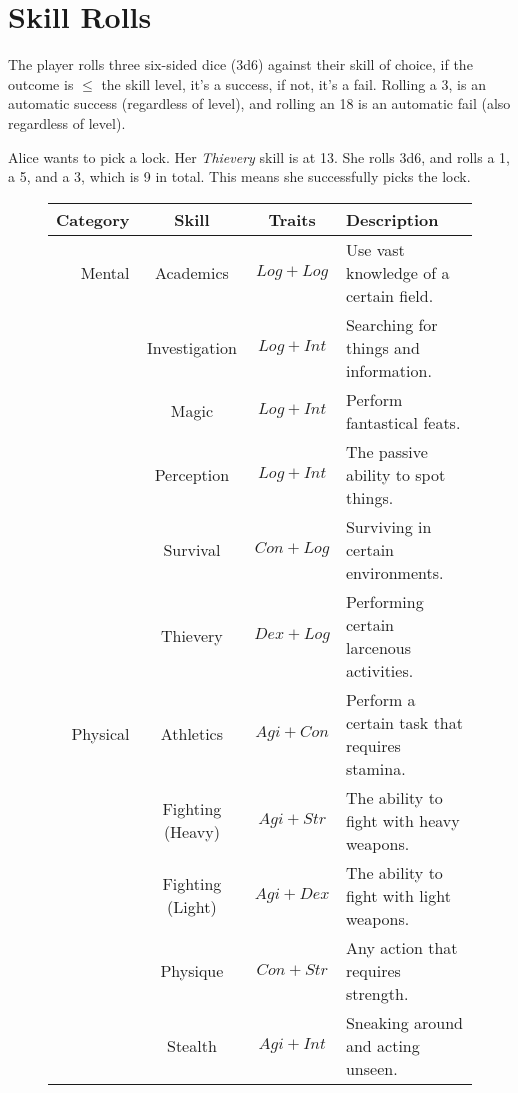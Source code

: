 \section{Skill Rolls}
The player rolls three six-sided dice (3d6) against their skill of choice, if the outcome is $\leq$ the skill level, it's a success, if not, it's a fail.
Rolling a 3, is an automatic success (regardless of level), and rolling an 18 is an automatic fail (also regardless of level).

\begin{example} 
    Alice wants to pick a lock. 
    Her \textit{Thievery} skill is at 13. 
    She rolls 3d6, and rolls a 1, a 5, and a 3, which is 9 in total. 
    This means she successfully picks the lock.
\end{example}

\begin{figure}
\centering
\begin{tabular}{r | c | c | l}
\textbf{Category} & \textbf{Skill}   & \textbf{Traits} & \textbf{Description} \\\hline
    Mental    & Academics        & $Log+Log$ & Use vast knowledge of a certain field.        \\
              & Investigation    & $Log+Int$ & Searching for things and information.         \\
              & Magic            & $Log+Int$ & Perform fantastical feats.                    \\
              & Perception       & $Log+Int$ & The passive ability to spot things.           \\
              & Survival         & $Con+Log$ & Surviving in certain environments.            \\
              & Thievery         & $Dex+Log$ & Performing certain larcenous activities.      \\\hline
    Physical  & Athletics        & $Agi+Con$ & Perform a certain task that requires stamina. \\
              & Fighting (Heavy) & $Agi+Str$ & The ability to fight with heavy weapons.      \\
              & Fighting (Light) & $Agi+Dex$ & The ability to fight with light weapons.      \\
              & Physique         & $Con+Str$ & Any action that requires strength.            \\
              & Stealth          & $Agi+Int$ & Sneaking around and acting unseen.            \\\hline

\end{tabular}
\end{figure}
